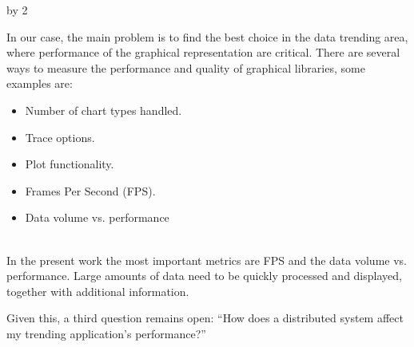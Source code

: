 \documentclass[11pt]{scrartcl}
\def\anzspalten{2}
\newlength{\kastenwidth}
\newenvironment{kasten}{
  \begin{lrbox}{\dummybox}
    \begin{minipage}{\linewidth}}
    {\end{minipage}
  \end{lrbox}
  \raisebox{-\depth}{\psshadowbox[cornersize=absolute,linearc=14pt,framesep=1em]{\usebox{\dummybox}}}\\[0.5em]}
\newenvironment{spalte}{
  \setlength\kastenwidth{1.2\textwidth}
  \divide\kastenwidth by \anzspalten
  \begin{minipage}[t]{\kastenwidth}}{\end{minipage}}
\begin{document}
\begin{lrbox}{\spalten}
{\begin{spalte}
\begin{kasten}
\begin{minipage}[t]{0.95\linewidth}
			In our case, the main problem is to find the best choice in the data trending
			area, where performance of the graphical representation are critical.
			There are several ways to measure the performance and quality of graphical
			libraries, some examples are:\\

			\begin{minipage}[t]{0.3\linewidth}
			\begin{itemize}
			    \item Number of chart types handled.
			    \item Trace options.
			\end{itemize}
			\end{minipage}
			\begin{minipage}[t]{0.3\linewidth}
			\begin{itemize}
			    \item Plot functionality.
			    \item Frames Per Second (FPS).
			\end{itemize}
			\end{minipage}
			\begin{minipage}[t]{0.3\linewidth}
			\begin{itemize}
		        \item Data volume vs. performance
			\end{itemize}
			\end{minipage}
			\\

			In the present work the most important metrics are FPS and the data
			volume vs. performance. Large amounts of data need to be quickly processed
			and displayed, together with additional information.
			
			
			Given this, a third question remains open: ``How does a distributed system
			affect my trending application's performance?''			
		\end{minipage} \hfill
      \end{kasten}
	  \begin{kasten}

\end{kasten}
\end{spalte}}
\end{lrbox}
\end{document}
